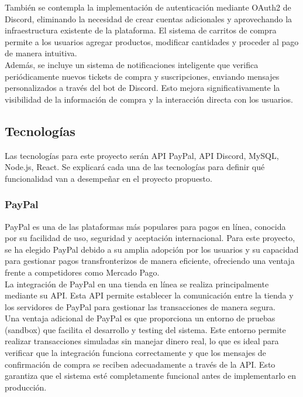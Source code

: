 \documentclass[a4paper,12pt]{article}
\begin{document}
También se contempla la implementación de autenticación mediante OAuth2 de Discord, eliminando la necesidad de crear cuentas adicionales y aprovechando la infraestructura existente de la plataforma. El sistema de carritos de compra permite a los usuarios agregar productos, modificar cantidades y proceder al pago de manera intuitiva.\\

Además, se incluye un sistema de notificaciones inteligente que verifica periódicamente nuevos tickets de compra y suscripciones, enviando mensajes personalizados a través del bot de Discord. Esto mejora significativamente la visibilidad de la información de compra y la interacción directa con los usuarios.\\
\newpage
\subsection{Tecnologías}

Las tecnologías para este proyecto serán API PayPal, API Discord, MySQL, Node.js, React. Se explicará cada una de las tecnologías para definir qué funcionalidad van a desempeñar en el proyecto propuesto.
\subsubsection{PayPal}

PayPal es una de las plataformas más populares para pagos en línea, conocida por su facilidad de uso, seguridad y aceptación internacional. Para este proyecto, se ha elegido PayPal debido a su amplia adopción por los usuarios y su capacidad para gestionar pagos transfronterizos de manera eficiente, ofreciendo una ventaja frente a competidores como Mercado Pago.\\

La integración de PayPal en una tienda en línea se realiza principalmente mediante su API. Esta API permite establecer la comunicación entre la tienda y los servidores de PayPal para gestionar las transacciones de manera segura.\\

Una ventaja adicional de PayPal es que proporciona un entorno de pruebas (sandbox) que facilita el desarrollo y testing del sistema. Este entorno permite realizar transacciones simuladas sin manejar dinero real, lo que es ideal para verificar que la integración funciona correctamente y que los mensajes de confirmación de compra se reciben adecuadamente a través de la API. Esto garantiza que el sistema esté completamente funcional antes de implementarlo en producción.\\
\end{document}
